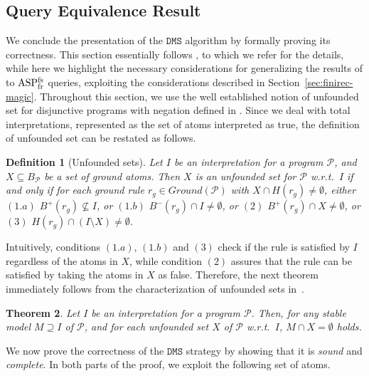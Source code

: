 \documentclass{tlp}
\newcommand{\p}{\ensuremath{{\mathcal{P}}}}
\newcommand{\BP}{\ensuremath{B_{\p}}}
\newcommand{\R}{\ensuremath{r}}
\newcommand{\ground}[1]{\ensuremath{Ground(#1)}}
\newcommand{\head}[1]{\ensuremath{H(#1)}}
\newcommand{\posbody}[1]{\ensuremath{B^+(#1)}}
\newcommand{\negbody}[1]{\ensuremath{B^-(#1)}}
\newtheorem{theorem}{Theorem}[section]
\newtheorem{definition}[theorem]{Definition}
\newcommand{\DMS}{\ensuremath{\mathtt{DMS}}}
\newcommand{\ASPFNFR}{\ensuremath{\rm ASP^{\rm fs}_{\rm fr}}}
\begin{document}
\subsection{Query Equivalence Result}\label{sec:teoria}

We conclude the presentation of the $\DMS$ algorithm by formally proving its correctness. This section essentially follows \cite{alvi-etal-2009-TR}, to which we refer for the details, while here we highlight the necessary considerations for generalizing the results of \cite{alvi-etal-2009-TR} to \ASPFNFR{} queries, exploiting the considerations described in Section~\ref{sec:finirec-magic}. Throughout this section, we
use the well established notion of unfounded set for disjunctive programs with negation
defined in \cite{leon-etal-97b}. Since we deal with total interpretations, represented as the set of atoms interpreted as true, the
definition of unfounded set can be restated as follows.

\begin{definition}[Unfounded sets]
\label{def:unfoundedset} Let $I$ be an interpretation for a program $\p$, and $X \subseteq \BP$
be a set of ground atoms. Then $X$ is an \emph{unfounded set} for $\p$ w.r.t.\ $I$ if and only if for each ground rule
$\R_g \in \ground{\p}$ with $X \cap \head{\R_g} \neq \emptyset$, either $(1.a)$ $\posbody{\R_g} \not\subseteq I$, 
or $(1.b)$ $\negbody{\R_g} \cap I \neq \emptyset$, or
$(2)$ $\posbody{\R_g} \cap X \neq \emptyset$, or $(3)$ $\head{\R_g} \cap (I \setminus X) \neq \emptyset$.
\end{definition}

Intuitively, conditions $(1.a)$, $(1.b)$ and $(3)$ check if the rule is satisfied by $I$ regardless of the atoms in $X$,
while condition $(2)$ assures that the rule can be satisfied by taking the atoms in $X$ as false.
Therefore, the next theorem immediately follows from the characterization of
unfounded sets in~\cite{leon-etal-97b}.

\begin{theorem}\label{theo:unfounded}
Let $I$ be an interpretation for a program $\p$. Then, for any stable 
model $M \supseteq I$ of $\p$, and for each unfounded set $X$ of $\p$ w.r.t.\ $I$, 
$M \cap X = \emptyset$ holds. 
\end{theorem}

We now prove the correctness of the $\DMS$ strategy by showing that it is
\emph{sound} and \emph{complete}.
In both parts of the proof, we exploit the following set of atoms.
\end{document}
